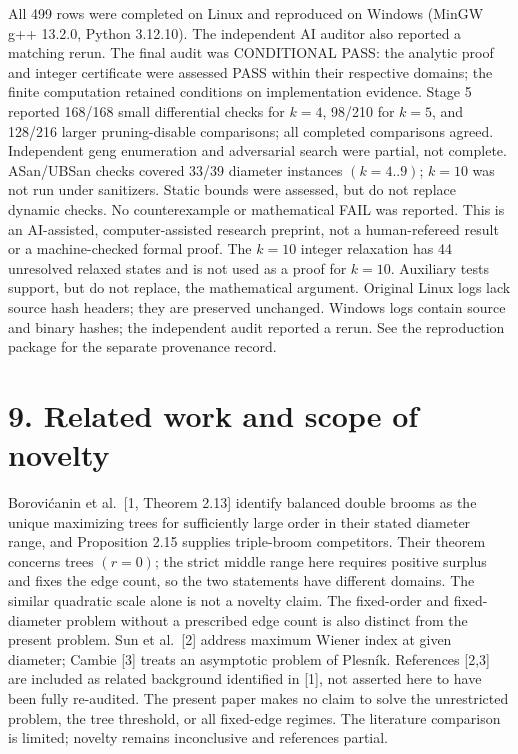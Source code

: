 \documentclass[
  11pt,
]{article}
\begin{document}
All 499 rows were completed on Linux and reproduced on Windows (MinGW
g++ 13.2.0, Python 3.12.10). The independent AI auditor also reported a
matching rerun. The final audit was CONDITIONAL PASS: the analytic proof
and integer certificate were assessed PASS within their respective
domains; the finite computation retained conditions on implementation
evidence. Stage 5 reported 168/168 small differential checks for
\(k=4\), 98/210 for \(k=5\), and 128/216 larger pruning-disable
comparisons; all completed comparisons agreed. Independent geng
enumeration and adversarial search were partial, not complete.
ASan/UBSan checks covered 33/39 diameter instances \((k=4..9)\);
\(k=10\) was not run under sanitizers. Static bounds were assessed, but
do not replace dynamic checks. No counterexample or mathematical FAIL
was reported. This is an AI-assisted, computer-assisted research
preprint, not a human-refereed result or a machine-checked formal proof.
The \(k=10\) integer relaxation has 44 unresolved relaxed states and is
not used as a proof for \(k=10\). Auxiliary tests support, but do not
replace, the mathematical argument. Original Linux logs lack source hash
headers; they are preserved unchanged. Windows logs contain source and
binary hashes; the independent audit reported a rerun. See the
reproduction package for the separate provenance record.

\section{9. Related work and scope of
novelty}\label{related-work-and-scope-of-novelty}

Borovićanin et al.~{[}1, Theorem 2.13{]} identify balanced double brooms
as the unique maximizing trees for sufficiently large order in their
stated diameter range, and Proposition 2.15 supplies triple-broom
competitors. Their theorem concerns trees \((r=0)\); the strict middle
range here requires positive surplus and fixes the edge count, so the
two statements have different domains. The similar quadratic scale alone
is not a novelty claim. The fixed-order and fixed-diameter problem
without a prescribed edge count is also distinct from the present
problem. Sun et al.~{[}2{]} address maximum Wiener index at given
diameter; Cambie {[}3{]} treats an asymptotic problem of Plesník.
References {[}2,3{]} are included as related background identified in
{[}1{]}, not asserted here to have been fully re-audited. The present
paper makes no claim to solve the unrestricted problem, the tree
threshold, or all fixed-edge regimes. The literature comparison is
limited; novelty remains inconclusive and references partial.
\end{document}
